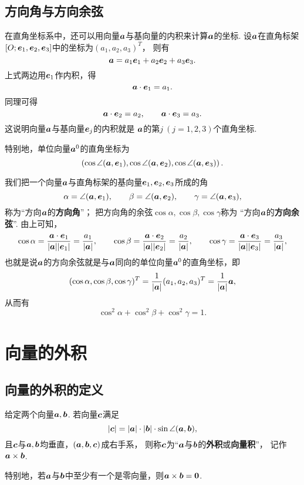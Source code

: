 \subsection{方向角与方向余弦}
在直角坐标系中，还可以用向量\(\boldsymbol{a}\)与基向量的内积来计算\(\boldsymbol{a}\)的坐标.
设\(\boldsymbol{a}\)在直角标架\([O;\boldsymbol{e}_1,\boldsymbol{e}_2,\boldsymbol{e}_3]\)中的坐标为\((a_1,a_2,a_3)^T\)，
则有\[
	\boldsymbol{a}=a_1 \boldsymbol{e}_1 + a_2 \boldsymbol{e}_2 + a_3 \boldsymbol{e}_3.
\]
上式两边用\(\boldsymbol{e}_1\)作内积，得\[
	\boldsymbol{a}\cdot\boldsymbol{e}_1 = a_1.
\]
同理可得\[
	\boldsymbol{a}\cdot\boldsymbol{e}_2 = a_2, \qquad
	\boldsymbol{a}\cdot\boldsymbol{e}_3 = a_3.
\]
这说明向量\(\boldsymbol{a}\)与基向量\(\boldsymbol{e}_j\)的内积就是
\(\boldsymbol{a}\)的第\(j\ (j=1,2,3)\)个直角坐标.

特别地，单位向量\(\boldsymbol{a}^0\)的直角坐标为\[
	\left( \cos\angle(\boldsymbol{a},\boldsymbol{e}_1),
	\cos\angle(\boldsymbol{a},\boldsymbol{e}_2),
	\cos\angle(\boldsymbol{a},\boldsymbol{e}_3) \right).
\]

我们把一个向量\(\boldsymbol{a}\)与直角标架的基向量\(\boldsymbol{e}_1,\boldsymbol{e}_2,\boldsymbol{e}_3\)所成的角\[
	\alpha=\angle(\boldsymbol{a},\boldsymbol{e}_1), \qquad
	\beta=\angle(\boldsymbol{a},\boldsymbol{e}_2), \qquad
	\gamma=\angle(\boldsymbol{a},\boldsymbol{e}_3),
\]称为“方向\(\boldsymbol{a}\)的\textbf{方向角}”；
把方向角的余弦\(\cos\alpha,\cos\beta,\cos\gamma\)称为
“方向\(\boldsymbol{a}\)的\textbf{方向余弦}”.
由上可知，\[
	\cos\alpha
	= \frac{\boldsymbol{a}\cdot\boldsymbol{e}_1}{\abs{\boldsymbol{a}}\abs{\boldsymbol{e}_1}}
	= \frac{a_1}{\abs{\boldsymbol{a}}},
	\qquad
	\cos\beta
	= \frac{\boldsymbol{a}\cdot\boldsymbol{e}_2}{\abs{\boldsymbol{a}}\abs{\boldsymbol{e}_2}}
	= \frac{a_2}{\abs{\boldsymbol{a}}},
	\qquad
	\cos\gamma
	= \frac{\boldsymbol{a}\cdot\boldsymbol{e}_3}{\abs{\boldsymbol{a}}\abs{\boldsymbol{e}_3}}
	= \frac{a_3}{\abs{\boldsymbol{a}}},
\]
也就是说\(\boldsymbol{a}\)的方向余弦就是与\(\boldsymbol{a}\)同向的单位向量\(\boldsymbol{a}^0\)的直角坐标，即\[
	(\cos\alpha,\cos\beta,\cos\gamma)^T
	= \frac{1}{\abs{\boldsymbol{a}}} (a_1,a_2,a_3)^T
	= \frac{1}{\abs{\boldsymbol{a}}} \boldsymbol{a},
\]
从而有\[
	\cos^2\alpha+\cos^2\beta+\cos^2\gamma=1.
\]

\section{向量的外积}
\subsection{向量的外积的定义}
\begin{definition}
给定两个向量\(\boldsymbol{a},\boldsymbol{b}\).
若向量\(\boldsymbol{c}\)满足
\begin{equation}\label{equation:解析几何.向量外积的长度关系}
	\abs{\boldsymbol{c}}
	= \abs{\boldsymbol{a}} \cdot \abs{\boldsymbol{b}} \cdot \sin\angle(\boldsymbol{a},\boldsymbol{b}),
\end{equation}
且\(\boldsymbol{c}\)与\(\boldsymbol{a},\boldsymbol{b}\)均垂直，\((\boldsymbol{a},\boldsymbol{b},\boldsymbol{c})\)成右手系，
则称\(\boldsymbol{c}\)为“\(\boldsymbol{a}\)与\(\boldsymbol{b}\)的\textbf{外积}或\textbf{向量积}”，
记作\(\boldsymbol{a}\times\boldsymbol{b}\).

特别地，若\(\boldsymbol{a}\)与\(\boldsymbol{b}\)中至少有一个是零向量，则\(\boldsymbol{a}\times\boldsymbol{b}=\boldsymbol{0}\).
\end{definition}

